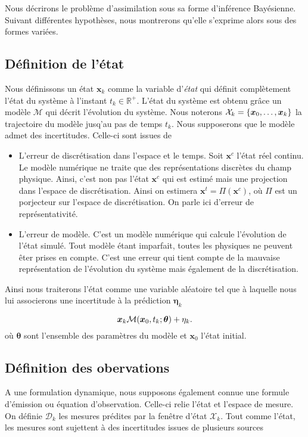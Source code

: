 Nous décrirons le problème d'assimilation sous sa forme d'inférence Bayésienne. Suivant différentes hypothèses, nous montrerons qu'elle s'exprime alors sous des formes variées.

\subsection{Définition de l'état}
Nous définissons un état $\bm x_k$ comme la variable d'\textit{état} qui définit complètement l'état du système à l'instant $t_k \in \mathbb R^+$. L'état du système est obtenu grâce un modèle $\mathcal{M}$ qui décrit l'évolution du système.
Nous noterons $\mathcal X_k = \{\bm{x}_0, \dots, \bm{x}_k\}$ la trajectoire du modèle jusq'au pas de temps $t_k$.
Nous supposerons que le modèle admet des incertitudes. Celle-ci sont issues de

\begin{itemize}
    \item L'erreur de discrétisation dans l'espace et le temps. Soit $\bm x^c$ l'état réel continu. Le modèle numérique ne traite que des représentations discrètes du champ physique. Ainsi, c'est non pas l'état $\bm x^c$ qui est estimé mais une projection dans l'espace de discrétisation. Ainsi on estimera $\bm x^t = \Pi(\bm{x}^c)$, où $\Pi$ est un porjecteur sur l'espace de discrétisation. On parle ici d'erreur de représentativité.
    \item L'erreur de modèle. C'est un modèle numérique qui calcule l'évolution de l'état simulé. Tout modèle étant imparfait, toutes les physiques ne peuvent êter prises en compte. C'est une erreur qui tient compte de la mauvaise représentation de l'évolution du système mais également de la discrétisation.
\end{itemize}

Ainsi nous traiterons l'état comme une variable aléatoire tel que à laquelle nous lui associerons une incertitude à la prédiction $\bm \eta_k$

\begin{equation*}
    \bm x_k \mathcal{M}(\bm{x}_0, t_k ; \bm \theta) + \eta_k.
\end{equation*}
où $\bm \theta$ sont l'ensemble des paramètres du modèle et $\bm x_0$ l'état initial.

\subsection{Définition des obervations}
A une formulation dynamique, nous supposons également connue une formule d'émission ou équation d'observation. Celle-ci relie l'état et l'espace de mesure. On définie $\mathcal{D}_k$ les mesures prédites par la fenêtre d'état $\mathcal{X}_k$. Tout comme l'état, les mesures sont sujettent à des incertitudes issues de plusieurs sources

